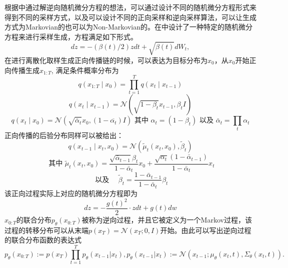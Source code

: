 根据\cite{score_based_SDE}中通过解逆向随机微分方程的想法，可以通过设计不同的随机微分方程形式来得到不同的采样方式，以及可以设计不同的正向采样和逆向采样算法，可以让生成方式为Markovian的也可以为Non-Markovian的。在\cite{DDPM}中设计了一种特定的随机微分方程来进行采样生成，方程满足如下形式。
\begin{equation}
    dz = -\left(\beta(t)/2\right)z dt + \sqrt{\beta(t)}dW_t,
    \label{DDPM Equation}
\end{equation}
在进行离散化取样生成正向传播链的时候，可以表达为目标分布为$x_0$，从$x_0$开始正向传播生成$x_{1:T}$, 满足条件概率分布为
\begin{equation}
    q\left(x_{1: T} \mid x_0\right)=\prod_{t=1}^T q\left(x_t \mid x_{t-1}\right)
    \end{equation}
    \begin{equation}
        q\left(x_t \mid x_{t-1}\right)=\mathcal{N}\left(\sqrt{1-\beta_t} x_{t-1}, \beta_t I\right)
        \end{equation}
        \begin{equation}
            q\left(x_t \mid x_0\right)=\mathcal{N}\left(\sqrt{\bar{\alpha}_t} x_0,\left(1-\overline{\alpha_t}\right) I\right) \text { 其中 } \alpha_t=\left(1-\beta_t\right) \text { 以及 } \bar{\alpha}_t=\prod_t \alpha_t
            \label{posterior of xt}
            \end{equation}
    正向传播的后验分布同样可以被给出：
    \begin{equation}
        q\left(x_{t-1} \mid x_t, x_0\right)=\mathcal{N}\left(\tilde{\mu}_t\left(x_t, x_0\right), \tilde{\beta}_t\right)
        \label{posterior xt 2}
        \end{equation}
        \begin{equation}
            \text {     其中 } \tilde{\mu}_t\left(x_t, x_0\right)=\frac{\sqrt{\bar{\alpha}_{t-1}} \beta_t}{1-\bar{\alpha}_t} x_0+\frac{\sqrt{\alpha_t}\left(1-\bar{\alpha}_{t-1}\right)}{1-\bar{\alpha}_t} x_t
            \end{equation}
            \begin{equation}
                \text { 以及 } \quad \tilde{\beta}_t=\frac{1-\bar{\alpha}_{t-1}}{1-\bar{\alpha}_t} \beta_t
                \end{equation}
该正向过程实际上对应的随机微分方程即为
\begin{equation}
    dz = -\frac{g(t)^2}{2}\cdot  z dt + g(t)dw
\end{equation}
$x_{0:T}$的联合分布$p_{\theta}(x_{0:T})$被称为逆向过程，并且它被定义为一个Markov过程，该过程的转移分布可以从末端$p(x_T)= \mathcal{N}(x_T;0,I) $开始。由此可以写出逆向过程的联合分布函数的表达式
\begin{equation}
    p_{\theta}(x_{0:T}) := p(x_T)\prod_{t=1}^{T}p_{\theta}(x_{t-1}|x_t), p_{\theta}(x_{t-1}|x_t) :=\mathcal{N}(x_{t-1};\mu_{\theta}(x_t,t),\Sigma_{\theta}(x_t,t)).  
\end{equation}


